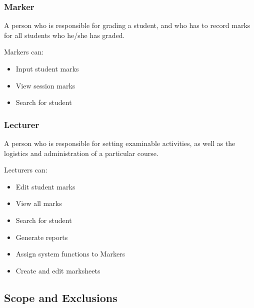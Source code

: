 \documentclass[a4paper]{article}
\begin{document}
			\subsubsection{Marker}
				\begin{flushleft}
				A person who is responsible for grading a student, and who has to record marks for all students who he/she has graded. \linebreak 
				
				Markers can:
				\end{flushleft}
				\begin{itemize}

					\item{Input student marks}
					
					\item{View session marks}
					
					\item{Search for student}

				\end{itemize}
				
			\subsubsection{Lecturer}
				\begin{flushleft}
				A person who is responsible for setting examinable activities, as well as the logistics and administration of a particular course. \linebreak 
				
				Lecturers can:
				\end{flushleft}
				\begin{itemize}

					\item{Edit student marks}
					
					\item{View all marks}
					
					\item{Search for student}
					
					\item{Generate reports}
					
					\item{Assign system functions to Markers}
					
					\item{Create and edit marksheets}

				\end{itemize}
			\subsection{Scope and Exclusions}
\end{document}
